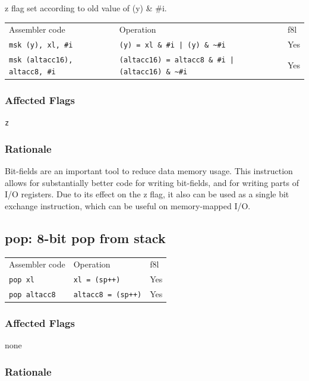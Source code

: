 \documentclass{book}
\begin{document}
z flag set according to old value of  (y) \& \#i.

\begin{tabular}{l l l}
Assembler code                        & Operation                                                    & f8l \\
\texttt{msk (y), xl, \#i}             & \texttt{(y) = xl \& \#i | (y) \& \~{}\#i}                    & Yes \\
\texttt{msk (altacc16), altacc8, \#i} & \texttt{(altacc16) = altacc8 \& \#i | (altacc16) \& \~{}\#i} & Yes \\
\end{tabular}

\subsubsection*{Affected Flags}

\texttt{z}

\subsubsection*{Rationale}

Bit-fields are an important tool to reduce data memory usage. This instruction allows for substantially better code for writing bit-fields, and for writing parts of I/O registers. Due to its effect on the z flag, it also can be used as a single bit exchange instruction, which can be useful on memory-mapped I/O.


\subsection{pop: 8-bit pop from stack}

\begin{tabular}{l l l}
Assembler code       & Operation                 & f8l \\
\texttt{pop xl}      & \texttt{xl = (sp++)}      & Yes \\
\texttt{pop altacc8} & \texttt{altacc8 = (sp++)} & Yes \\
\end{tabular}

\subsubsection*{Affected Flags}

none

\subsubsection*{Rationale}
\end{document}
